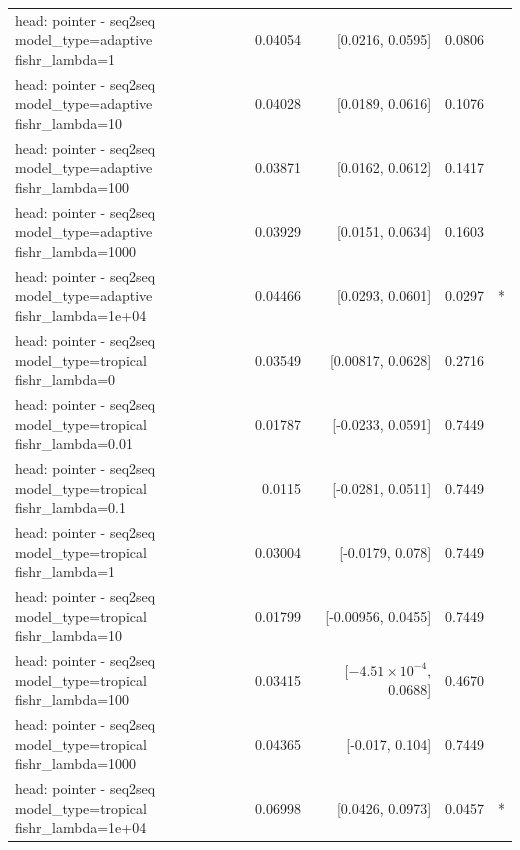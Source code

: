 \documentclass[10pt]{article}
\makeatletter
\newcommand{\stackcell}[1]{\begin{tabular}[t]{@{}l@{}}#1\end{tabular}}
\makeatother
\begin{document}
{\begin{longtable}{lrrrl}
\stackcell{head: pointer - seq2seq\\\footnotesize model\_type=adaptive fishr\_lambda=1 } & 0.04054 & [0.0216, 0.0595] & 0.0806 & \\
\stackcell{head: pointer - seq2seq\\\footnotesize model\_type=adaptive fishr\_lambda=10 } & 0.04028 & [0.0189, 0.0616] & 0.1076 & \\
\stackcell{head: pointer - seq2seq\\\footnotesize model\_type=adaptive fishr\_lambda=100 } & 0.03871 & [0.0162, 0.0612] & 0.1417 & \\
\stackcell{head: pointer - seq2seq\\\footnotesize model\_type=adaptive fishr\_lambda=1000 } & 0.03929 & [0.0151, 0.0634] & 0.1603 & \\
\stackcell{head: pointer - seq2seq\\\footnotesize model\_type=adaptive fishr\_lambda=1e+04 } & 0.04466 & [0.0293, 0.0601] & 0.0297 & *\\
\stackcell{head: pointer - seq2seq\\\footnotesize model\_type=tropical fishr\_lambda=0 } & 0.03549 & [0.00817, 0.0628] & 0.2716 & \\
\stackcell{head: pointer - seq2seq\\\footnotesize model\_type=tropical fishr\_lambda=0.01 } & 0.01787 & [-0.0233, 0.0591] & 0.7449 & \\
\stackcell{head: pointer - seq2seq\\\footnotesize model\_type=tropical fishr\_lambda=0.1 } & 0.0115 & [-0.0281, 0.0511] & 0.7449 & \\
\stackcell{head: pointer - seq2seq\\\footnotesize model\_type=tropical fishr\_lambda=1 } & 0.03004 & [-0.0179, 0.078] & 0.7449 & \\
\stackcell{head: pointer - seq2seq\\\footnotesize model\_type=tropical fishr\_lambda=10 } & 0.01799 & [-0.00956, 0.0455] & 0.7449 & \\
\stackcell{head: pointer - seq2seq\\\footnotesize model\_type=tropical fishr\_lambda=100 } & 0.03415 & [$-4.51\times10^{-4}$, 0.0688] & 0.4670 & \\
\stackcell{head: pointer - seq2seq\\\footnotesize model\_type=tropical fishr\_lambda=1000 } & 0.04365 & [-0.017, 0.104] & 0.7449 & \\
\stackcell{head: pointer - seq2seq\\\footnotesize model\_type=tropical fishr\_lambda=1e+04 } & 0.06998 & [0.0426, 0.0973] & 0.0457 & *\\

\end{longtable}}
\end{document}
